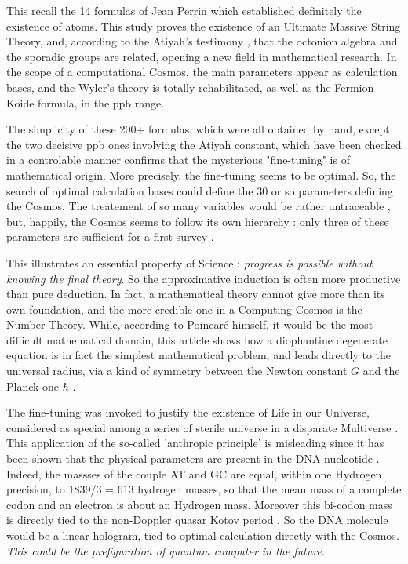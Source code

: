 \documentclass[a4paper,9pt]{article}
\begin{document}
This recall the 14 formulas of Jean Perrin which established definitely the existence of atoms. This study proves the existence of an Ultimate Massive String Theory, and, according to the Atiyah's testimony \cite{Atiyah}, that the octonion algebra and the sporadic groups are related, opening a new field in mathematical research. In the scope of a computational Cosmos, the main parameters appear as calculation bases, and the Wyler's theory is totally rehabilitated, as well as the Fermion Koide formula, in the ppb range.  



The simplicity of these 200+ formulas, which were all obtained by hand, except the two decisive ppb ones involving the Atiyah constant, which have been checked in a controlable manner \cite{LaGuer} confirms that the mysterious "fine-tuning" is of mathematical origin. More precisely, the fine-tuning seems to be optimal. So, the search of optimal calculation bases could define the 30 or so parameters defining the Cosmos. The treatement of so many variables would be rather untraceable , but, happily, the Cosmos seems to follow its own hierarchy : only three of these parameters are sufficient for a first survey \cite{Carr}. 


This illustrates an essential property of Science : \textit{progress is possible without knowing the final theory}. So the approximative induction is often more productive than pure deduction. In fact, a mathematical theory cannot give more than its own foundation, and the more credible one in a Computing Cosmos is the Number Theory. While, according to Poincar\'e himself, it would be the most difficult mathematical domain, this article shows how a diophantine degenerate equation is in fact the simplest mathematical problem, and leads directly to the universal radius, via a kind of symmetry between the Newton constant $G$ and the Planck one $\hbar$ .   


The fine-tuning was invoked to justify the existence of Life in our Universe, considered as special among a series of sterile universe in a disparate Multiverse \cite{Carr}. This application of the so-called 'anthropic principle' is misleading since it has been shown that the physical parameters are present in the DNA nucleotide \cite{Sanchez}. Indeed, the massses of the couple AT and GC are equal, within one Hydrogen precision, to 1839/3 = 613 hydrogen masses, so that the mean mass of a complete codon and an electron is about an Hydrogen mass. Moreover this bi-codon mass is directly tied to the non-Doppler quasar Kotov period \cite{Sanchez3}. So the DNA molecule would be a linear hologram, tied to optimal calculation directly with the Cosmos. \textit{This could be the prefiguration of quantum computer in the future.}
\end{document}
